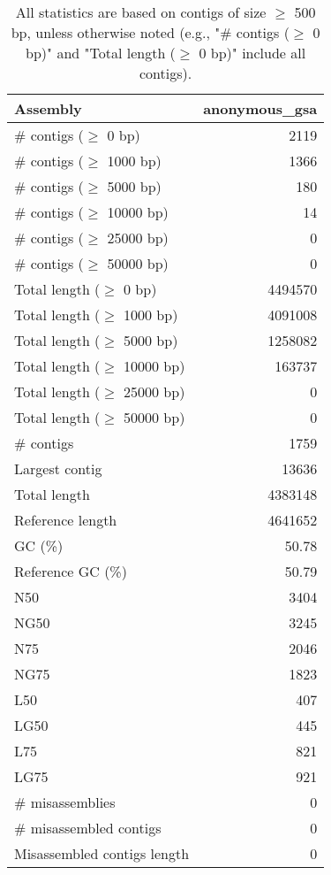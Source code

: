 \documentclass[12pt,a4paper]{article}
\begin{document}
\begin{table}[ht]
\begin{center}
\caption{All statistics are based on contigs of size $\geq$ 500 bp, unless otherwise noted (e.g., "\# contigs ($\geq$ 0 bp)" and "Total length ($\geq$ 0 bp)" include all contigs).}
\begin{tabular}{|l*{1}{|r}|}
\hline
Assembly & anonymous\_gsa \\ \hline
\# contigs ($\geq$ 0 bp) & 2119 \\ \hline
\# contigs ($\geq$ 1000 bp) & 1366 \\ \hline
\# contigs ($\geq$ 5000 bp) & 180 \\ \hline
\# contigs ($\geq$ 10000 bp) & 14 \\ \hline
\# contigs ($\geq$ 25000 bp) & 0 \\ \hline
\# contigs ($\geq$ 50000 bp) & 0 \\ \hline
Total length ($\geq$ 0 bp) & 4494570 \\ \hline
Total length ($\geq$ 1000 bp) & 4091008 \\ \hline
Total length ($\geq$ 5000 bp) & 1258082 \\ \hline
Total length ($\geq$ 10000 bp) & 163737 \\ \hline
Total length ($\geq$ 25000 bp) & 0 \\ \hline
Total length ($\geq$ 50000 bp) & 0 \\ \hline
\# contigs & 1759 \\ \hline
Largest contig & 13636 \\ \hline
Total length & 4383148 \\ \hline
Reference length & 4641652 \\ \hline
GC (\%) & 50.78 \\ \hline
Reference GC (\%) & 50.79 \\ \hline
N50 & 3404 \\ \hline
NG50 & 3245 \\ \hline
N75 & 2046 \\ \hline
NG75 & 1823 \\ \hline
L50 & 407 \\ \hline
LG50 & 445 \\ \hline
L75 & 821 \\ \hline
LG75 & 921 \\ \hline
\# misassemblies & 0 \\ \hline
\# misassembled contigs & 0 \\ \hline
Misassembled contigs length & 0 \\ \hline

\end{tabular}
\end{center}
\end{table}
\end{document}
